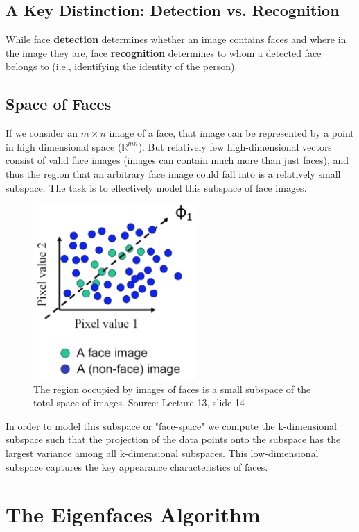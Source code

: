 \documentclass{article}
\begin{document}
\subsection{A Key Distinction: Detection vs. Recognition}
While face \textbf{detection} determines whether an image contains faces and where in the image they are, face \textbf{recognition} determines to \underline{whom} a detected face belongs to (i.e., identifying the identity of the person).

\subsection{Space of Faces}
If we consider an $m \times n$ image of a face, that image can be represented by a point in high dimensional space (${\mathbb{R}}^{mn}$). But relatively few high-dimensional vectors consist of valid face images (images can contain much more than just faces), and thus the region that an arbitrary face image could fall into is a relatively small subspace. The task is to effectively model this subspace of face images.

\begin{figure}[h]
  \centering
  \includegraphics[width=0.55\textwidth]{face_non-face_plot}
  \caption{The region occupied by images of faces is a small subspace of the total space of images. Source: Lecture 13, slide 14}
\end{figure}

In order to model this subspace or "face-space" we compute the k-dimensional subspace such that the projection of the data points onto the subspace has the largest variance among all k-dimensional subspaces. This low-dimensional subspace captures the key appearance characteristics of faces. 

\section{The Eigenfaces Algorithm}
\end{document}
